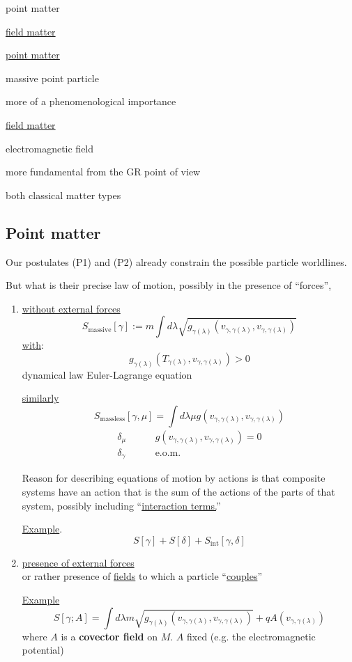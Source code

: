 	point matter
	
	\underline{field matter}
	
	\underline{point matter}
	
	massive point particle 
	
	more of a phenomenological importance
	
	\underline{field matter}
	
	electromagnetic field
	
	more fundamental from the GR point of view
	
	
	both classical matter types
	
	
	\subsection{Point matter}
	
	Our postulates (P1) and (P2) already constrain the possible particle worldlines.  
	
	But what is their precise law of motion, possibly in the presence of ``forces'',
	
	\begin{enumerate}
		\item[(a)] \underline{without external forces}
		\[
		S_{\text{massive}}[\gamma] := m \int d\lambda \sqrt{ g_{\gamma(\lambda)}( v_{\gamma,\gamma(\lambda)} , v_{\gamma,\gamma(\lambda) } ) }
		\]
		\underline{with}:
		\[
		g_{\gamma(\lambda)}(T_{\gamma(\lambda)}, v_{\gamma, \gamma(\lambda) } ) > 0 
		\]
		dynamical law Euler-Lagrange equation
		
		\underline{similarly}
		\[
		S_{\text{massless}}[\gamma,\mu] = \int d\lambda \mu g(v_{\gamma, \gamma(\lambda)} , v_{\gamma,\gamma(\lambda)} )
		\]
		\[
		\begin{aligned}
		\delta_{\mu}  \quad \quad \, & g(v_{\gamma,\gamma(\lambda)}, v_{\gamma,\gamma(\lambda) } ) = 0 \\
		\delta_{\gamma} \quad \quad \, & \text{e.o.m.}
		\end{aligned}
		\]
		
		Reason for describing equations of motion by actions is that composite systems have an action that is the sum of the actions of the parts of that system, possibly including ``\underline{interaction terms.}''
		
		\underline{Example}. \[
		S[\gamma] + S[\delta] + S_{\text{int}}[\gamma,\delta]
		\]
		\item[(b)] \underline{presence of external forces} \\
		or rather presence of \underline{fields} to which a particle ``\underline{couples}''
		
		\underline{Example}
		\[
		S[\gamma;A] = \int d\lambda m \sqrt{ g_{\gamma(\lambda)}(v_{\gamma, \gamma(\lambda)}, v_{\gamma,\gamma(\lambda)} ) } + qA(v_{\gamma,\gamma(\lambda)})
		\]
		where $A$ is a \textbf{covector field} on $M$. $A$ fixed
		(e.g. the electromagnetic potential)
	\end{enumerate}
	
